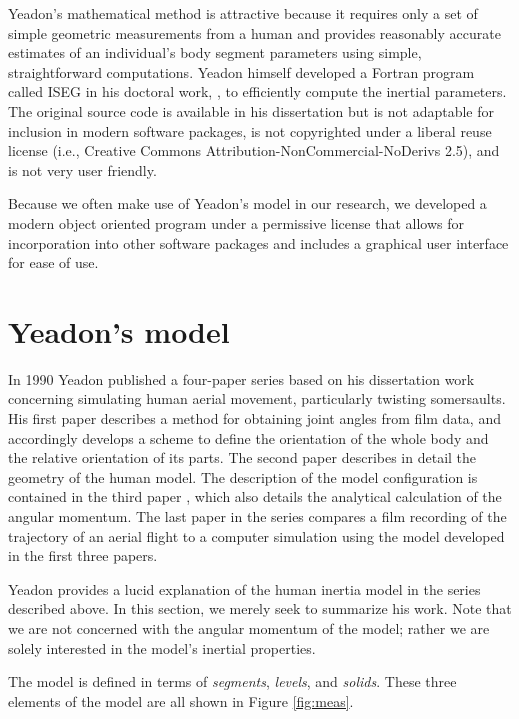 \documentclass[10pt,a4paper,twocolumn]{article}
\begin{document}
Yeadon's mathematical method \cite{Yeadon1990c} is attractive because it requires only a set of
simple geometric measurements from a human and provides reasonably accurate
estimates of an individual's body segment parameters using simple,
straightforward computations. Yeadon himself developed a Fortran program called
ISEG in his doctoral work, \cite{Yeadon1984a}, to efficiently compute the
inertial parameters. The original source code is available in his dissertation but is
not adaptable for inclusion in modern software packages, is not copyrighted
under a liberal reuse license (i.e., Creative Commons
Attribution-NonCommercial-NoDerivs 2.5), and is not very user friendly.

Because we often make use of Yeadon's model in our research, we developed a
modern object oriented program under a permissive license that allows for
incorporation into other software packages and includes a graphical user interface
for ease of use.

\section*{Yeadon's model}

In 1990 Yeadon published a four-paper series based on his dissertation work
concerning simulating human aerial movement, particularly twisting somersaults. His
first paper \cite{Yeadon1990c} describes a method for obtaining joint angles
from film data, and accordingly develops a scheme to define the orientation of
the whole body and the relative orientation of its parts. The second
paper \cite{Yeadon1990f} describes in detail the geometry of the human model.
The description of the model configuration is contained in the third
paper \cite{Yeadon1990e}, which also details the analytical calculation of the
angular momentum. The last paper in the series \cite{Yeadon1990d}
compares a film recording of the trajectory of an aerial flight to a
computer simulation using the model developed in the first three papers.

Yeadon provides a lucid explanation of the human inertia model in the series
described above. In this section, we merely seek to summarize his work. Note
that we are not concerned with the angular momentum of the model; rather we are solely
interested in the model's inertial properties.

The model is defined in terms of \emph{segments}, \emph{levels}, and
\emph{solids}. These three elements of the model are all shown in Figure
\ref{fig:meas}.
\end{document}
